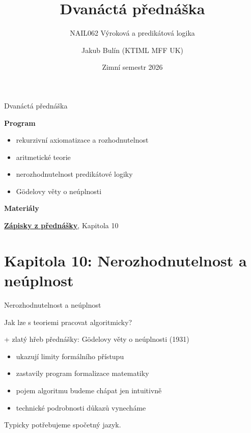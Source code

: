 \documentclass{beamer}
\title{Dvanáctá přednáška}
\subtitle{NAIL062 Výroková a predikátová logika}
\author{Jakub Bulín (KTIML MFF UK)}
\date{Zimní semestr 2026}
\begin{document}
\maketitle


\begin{frame}{Dvanáctá přednáška}

    \textbf{Program}
        \begin{itemize}            
            \item rekurzivní axiomatizace a rozhodnutelnost
            \item aritmetické teorie
            \item nerozhodnutelnost predikátové logiky
            \item Gödelovy věty o neúplnosti
        \end{itemize}

    \textbf{Materiály}

        \href{https://github.com/jbulin-mff-uk/nail062/raw/main/lecture/lecture-notes/lecture-notes.pdf}{\alert{\textbf{Zápisky z přednášky}}}, Kapitola 10

\end{frame}


\section{\sc Kapitola 10: Nerozhodnutelnost a neúplnost}


\begin{frame}{Nerozhodnutelnost a neúplnost}

    \pause
    Jak lze s teoriemi pracovat algoritmicky?

    \medskip

    \pause
    + zlatý hřeb přednášky: \alert{Gödelovy věty o neúplnosti} (1931)\pause
    \begin{itemize}
        \item ukazují limity formálního přístupu
        \item zastavily program formalizace matematiky
        \item pojem \alert{algoritmu} budeme chápat jen intuitivně
        \item technické podrobnosti důkazů vynecháme
        
    \end{itemize}

    \pause
    Typicky potřebujeme spočetný jazyk.
     
\end{frame}
\end{document}
